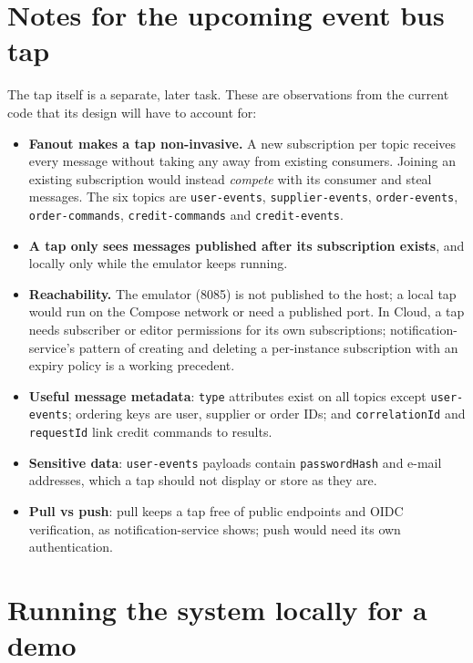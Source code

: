 \documentclass[11pt,a4paper]{article}
\newcommand{\code}[1]{\nolinkurl{#1}}
\begin{document}
\section{Notes for the upcoming event bus tap}
\label{sec:tap}

The tap itself is a separate, later task. These are observations from the current code
that its design will have to account for:
\begin{itemize}
  \item \textbf{Fanout makes a tap non-invasive.} A new subscription per topic receives
  every message without taking any away from existing consumers. Joining an existing
  subscription would instead \emph{compete} with its consumer and steal messages. The
  six topics are \code{user-events}, \code{supplier-events}, \code{order-events},
  \code{order-commands}, \code{credit-commands} and \code{credit-events}.
  \item \textbf{A tap only sees messages published after its subscription exists}, and
  locally only while the emulator keeps running.
  \item \textbf{Reachability.} The emulator (8085) is not published to the host; a local
  tap would run on the Compose network or need a published port. In Cloud, a tap
  needs subscriber or editor permissions for its own subscriptions;
  notification-service's pattern of creating and deleting a per-instance subscription
  with an expiry policy is a working precedent.
  \item \textbf{Useful message metadata}: \code{type} attributes exist on all topics
  except \code{user-events}; ordering keys are user, supplier or order IDs; and
  \code{correlationId} and \code{requestId} link credit commands to results.
  \item \textbf{Sensitive data}: \code{user-events} payloads contain
  \code{passwordHash} and e-mail addresses, which a tap should not display or store as
  they are.
  \item \textbf{Pull vs push}: pull keeps a tap free of public endpoints and OIDC
  verification, as notification-service shows; push would need its own authentication.
\end{itemize}

\appendix
\section{Running the system locally for a demo}
\label{app:run}
\end{document}
